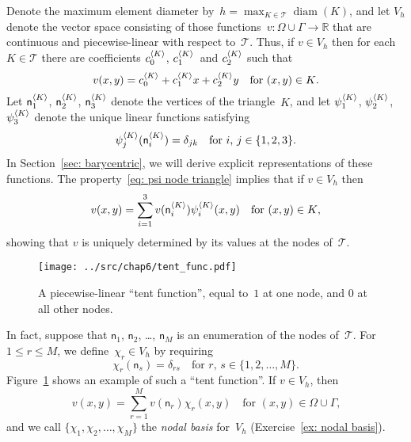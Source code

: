 Denote the maximum element diameter 
by~$h=\max_{K\in\mathcal{T}}\operatorname{diam}(K)$, and let $V_h$ denote the 
vector space consisting of those functions~$v:\Omega\cup\Gamma\to\mathbb{R}$ 
that are continuous and piecewise-linear with respect to~$\mathcal{T}$.  Thus,
if $v\in V_h$ then for each~$K\in\mathcal{T}$ there are coefficients 
$c^{\langle K\rangle}_0$, $c^{\langle K\rangle}_1$~and $c^{\langle K\rangle}_2$ such that
\begin{equation}\label{eq: v K 1 x y}
v(x,y)=c^{\langle K\rangle}_0+c^{\langle K\rangle}_1x+c^{\langle K\rangle}_2y
	\quad\text{for $(x,y)\in K$.}
\end{equation}
Let $\mathsf{n}^{\langle K\rangle}_1$, $\mathsf{n}^{\langle K\rangle}_2$, $\mathsf{n}^{\langle K\rangle}_3$ 
denote the vertices of the triangle~$K$, and let $\psi^{\langle K\rangle}_1$, 
$\psi^{\langle K\rangle}_2$, $\psi^{\langle K\rangle}_3$ denote the unique linear functions 
satisfying
\begin{equation}\label{eq: psi node triangle}
\psi^{\langle K\rangle}_j(\mathsf{n}^{\langle K\rangle}_i)=\delta_{jk}
	\quad\text{for $i$, $j\in\{1,2,3\}$.}
\end{equation}
In Section~\ref{sec: barycentric}, we will derive explicit representations of 
these functions.  The property~\eqref{eq: psi node triangle} implies that if 
$v\in V_h$ then
\[
v(x,y)=\sum_{i=1}^3v(\mathsf{n}^{\langle K\rangle}_i)\psi^{\langle K\rangle}_i(x,y)
	\quad\text{for $(x,y)\in K$,}
\]
showing that $v$ is uniquely determined by its values at the nodes 
of~$\mathcal{T}$.

\begin{figure}
\caption{A piecewise-linear ``tent function'', equal to~$1$ at one node, and 
$0$ at all other nodes.}\label{fig: tent func}
\begin{center}
\texttt{[image: ../src/chap6/tent\_func.pdf]}
\end{center}
\end{figure}

In fact, suppose that $\mathsf{n}_1$, $\mathsf{n}_2$, \dots, $\mathsf{n}_M$ is 
an enumeration of the nodes of~$\mathcal{T}$.  For~$1\le r\le M$, we 
define~$\chi_r\in V_h$ by requiring
\begin{equation}\label{eq: chi 2d}
\chi_r(\mathsf{n}_s)=\delta_{rs}\quad\text{for $r$, $s\in\{1, 2, \dots, M\}$.}
\end{equation}
Figure~\ref{fig: tent func} shows an example of such a ``tent function''.  
If $v\in V_h$, then
\[
v(x,y)=\sum_{r=1}^M v(\mathsf{n}_r)\chi_r(x,y)
	\quad\text{for $(x,y)\in\Omega\cup\Gamma$,}
\]
and we call $\{\chi_1,\chi_2,\ldots,\chi_M\}$ the \emph{nodal basis} for~$V_h$
(Exercise~\ref{ex: nodal basis}).

